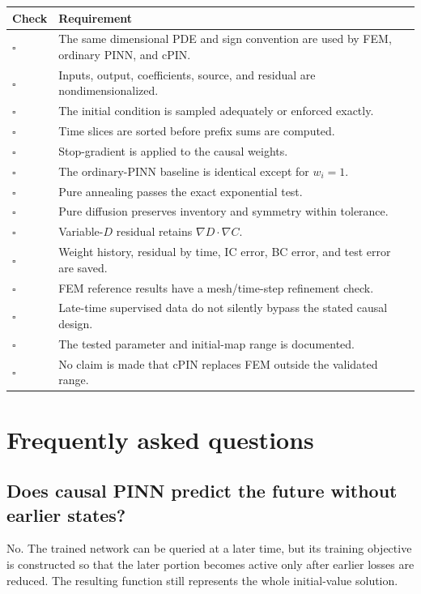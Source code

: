 \documentclass[11pt]{article}
\begin{document}
\begin{longtable}{p{}p{}}
\toprule
\textbf{Check} & \textbf{Requirement} \\
\midrule
$\square$ & The same dimensional PDE and sign convention are used by FEM, ordinary PINN, and cPIN. \\
$\square$ & Inputs, output, coefficients, source, and residual are nondimensionalized. \\
$\square$ & The initial condition is sampled adequately or enforced exactly. \\
$\square$ & Time slices are sorted before prefix sums are computed. \\
$\square$ & Stop-gradient is applied to the causal weights. \\
$\square$ & The ordinary-PINN baseline is identical except for $w_i=1$. \\
$\square$ & Pure annealing passes the exact exponential test. \\
$\square$ & Pure diffusion preserves inventory and symmetry within tolerance. \\
$\square$ & Variable-$D$ residual retains $\nabla D\cdot\nabla C$. \\
$\square$ & Weight history, residual by time, IC error, BC error, and test error are saved. \\
$\square$ & FEM reference results have a mesh/time-step refinement check. \\
$\square$ & Late-time supervised data do not silently bypass the stated causal design. \\
$\square$ & The tested parameter and initial-map range is documented. \\
$\square$ & No claim is made that cPIN replaces FEM outside the validated range. \\
\bottomrule
\end{longtable}

\section{Frequently asked questions}

\subsection*{Does causal PINN predict the future without earlier states?}

No. The trained network can be queried at a later time, but its training objective is constructed so that the later portion becomes active only after earlier losses are reduced. The resulting function still represents the whole initial-value solution.
\end{document}
